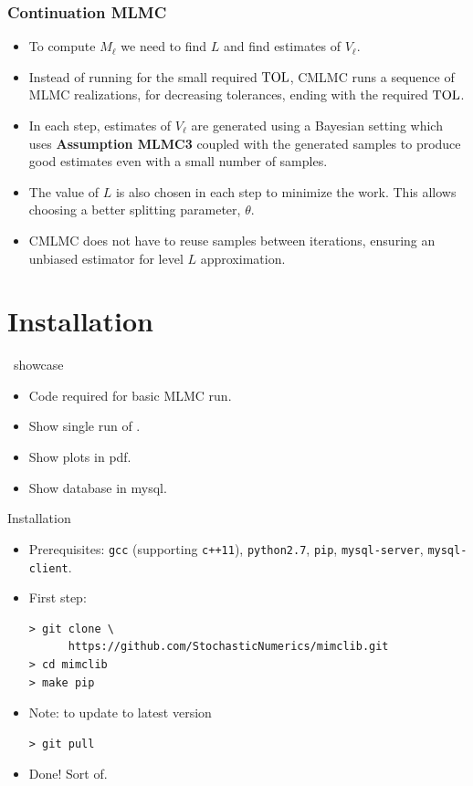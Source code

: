 
\begin{frame}\frametitle{Continuation MLMC}
\begin{itemize}
\item To compute $M_\ell$ we need to find $L$ and find estimates of
  $V_\ell$.
\pause
    \item Instead of running for the small required $\mathrm{TOL}$, CMLMC runs
      a sequence of MLMC realizations, for decreasing
      tolerances, ending with the required $\mathrm{TOL}$.
    \item In each step, estimates of $V_\ell$ are generated using a
      Bayesian setting which uses {\bf Assumption MLMC3} coupled with
      the generated samples to produce good estimates even with a
      small number of samples.
    \item The value of $L$ is also chosen in each step to minimize the
      work. This allows choosing a better splitting parameter,
      $\theta$.
    \item CMLMC does not have to reuse samples between iterations,
      ensuring an unbiased estimator for level $L$ approximation.
  \end{itemize}
\end{frame}


\section{Installation}

\begin{frame}{\lib~showcase}
  \begin{itemize}
  \item Code required for basic MLMC run.
  \item Show single run of \lib.
  \item Show plots in pdf.
  \item Show database in mysql.
  \end{itemize}
\end{frame}

\begin{frame}[fragile]{Installation}
\begin{itemize}
  \item Prerequisites: \texttt{gcc} (supporting \texttt{c++11}), \texttt{python2.7}, \texttt{pip}, \texttt{mysql-server}, \texttt{mysql-client}.
  \item First step:
\begin{verbatim}
> git clone \
      https://github.com/StochasticNumerics/mimclib.git
> cd mimclib
> make pip
\end{verbatim}
  \item Note: to update to latest version
\begin{verbatim}
> git pull
\end{verbatim}
\item Done! Sort of.
\end{itemize}
\end{frame}

